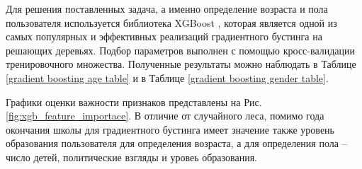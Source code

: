 Для решения поставленных задача, а именно определение возраста и пола пользователя используется библиотека XGBoost \cite{xgboost}, которая является одной из самых популярных и эффективных реализаций градиентного бустинга на решающих деревьях. Подбор параметров выполнен с помощью кросс-валидации тренировочного множества. Полученные результаты можно наблюдать в Таблице \ref{gradient boosting age table} и в Таблице \ref{gradient boosting gender table}.


Графики оценки важности признаков представлены на Рис. \ref{fig:xgb_feature_importace}. В отличие от случайного леса, помимо года окончания школы для градиентного бустинга имеет значение также уровень образования пользователя для определения возраста, а для определения пола -- число детей, политические взгляды и уровеь образования.




\clearpage







